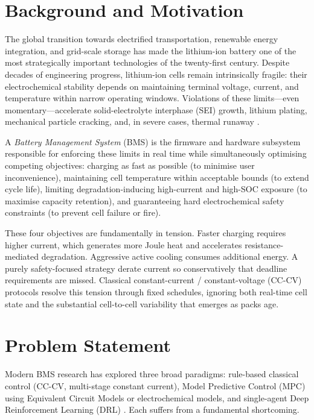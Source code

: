 \section{Background and Motivation}

The global transition towards electrified transportation, renewable
energy integration, and grid-scale storage has made the lithium-ion
battery one of the most strategically important technologies of the
twenty-first century.  Despite decades of engineering progress,
lithium-ion cells remain intrinsically fragile: their electrochemical
stability depends on maintaining terminal voltage, current, and
temperature within narrow operating windows.  Violations of these
limits---even momentary---accelerate solid-electrolyte interphase
(SEI) growth, lithium plating, mechanical particle cracking, and, in
severe cases, thermal runaway \cite{vetter2005ageing}.

A \emph{Battery Management System} (BMS) is the firmware and hardware
subsystem responsible for enforcing these limits in real time while
simultaneously optimising competing objectives: charging as fast as
possible (to minimise user inconvenience), maintaining cell
temperature within acceptable bounds (to extend cycle life), limiting
degradation-inducing high-current and high-SOC exposure (to maximise
capacity retention), and guaranteeing hard electrochemical safety
constraints (to prevent cell failure or fire).

These four objectives are fundamentally in tension.  Faster charging
requires higher current, which generates more Joule heat and
accelerates resistance-mediated degradation.  Aggressive active
cooling consumes additional energy.  A purely safety-focused strategy
derate current so conservatively that deadline requirements are
missed.  Classical constant-current / constant-voltage (CC-CV)
protocols resolve this tension through fixed schedules, ignoring both
real-time cell state and the substantial cell-to-cell variability that
emerges as packs age.

\section{Problem Statement}

Modern BMS research has explored three broad paradigms: rule-based
classical control (CC-CV, multi-stage constant current), Model
Predictive Control (MPC) using Equivalent Circuit Models or
electrochemical models, and single-agent Deep Reinforcement Learning
(DRL) \cite{park2020fastcharging, torchio2016lionsimba, wu2021dqn}.
Each suffers from a fundamental shortcoming.

